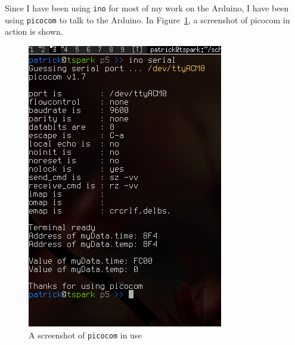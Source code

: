 \documentclass{hw}
\begin{document}
Since I have been using \texttt{ino} for most of my work on the Arduino, I have
been using \texttt{picocom} to talk to the Arduino. In Figure~\ref{shot}, a
screenshot of picocom in action is shown.

\begin{figure}[ht!]
  \centering
  \includegraphics[scale=0.7]{shot.png}
  \caption{A screenshot of \texttt{picocom} in use}
  \label{shot}
\end{figure}
\end{document}
